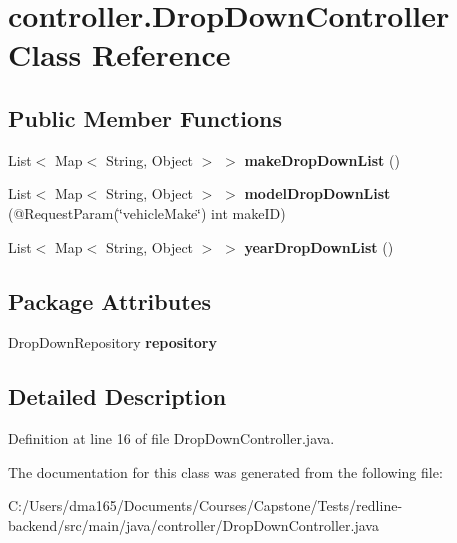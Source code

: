 \hypertarget{classcontroller_1_1_drop_down_controller}{}\section{controller.\+Drop\+Down\+Controller Class Reference}
\label{classcontroller_1_1_drop_down_controller}
\subsection*{Public Member Functions}
\begin{DoxyCompactItemize}
\item 
\mbox{\label{classcontroller_1_1_drop_down_controller_a5ab6dac9534b9ceacd0a7d291fa0b035}} 
List$<$ Map$<$ String, Object $>$ $>$ {\bfseries make\+Drop\+Down\+List} ()
\item 
\mbox{\label{classcontroller_1_1_drop_down_controller_af69cfbc0f2ff56ef5ce8b14c02f31a59}} 
List$<$ Map$<$ String, Object $>$ $>$ {\bfseries model\+Drop\+Down\+List} (@Request\+Param(\char`\"{}vehicle\+Make\char`\"{}) int make\+ID)
\item 
\mbox{\label{classcontroller_1_1_drop_down_controller_af99f2e294181795ab2f9250e62e79453}} 
List$<$ Map$<$ String, Object $>$ $>$ {\bfseries year\+Drop\+Down\+List} ()
\end{DoxyCompactItemize}
\subsection*{Package Attributes}
\begin{DoxyCompactItemize}
\item 
\mbox{\label{classcontroller_1_1_drop_down_controller_a17dbcfcd0a330aadf60e42d7ee9c0669}} 
Drop\+Down\+Repository {\bfseries repository}
\end{DoxyCompactItemize}


\subsection{Detailed Description}


Definition at line 16 of file Drop\+Down\+Controller.\+java.



The documentation for this class was generated from the following file\+:\begin{DoxyCompactItemize}
\item 
C\+:/\+Users/dma165/\+Documents/\+Courses/\+Capstone/\+Tests/redline-\/backend/src/main/java/controller/Drop\+Down\+Controller.\+java\end{DoxyCompactItemize}
